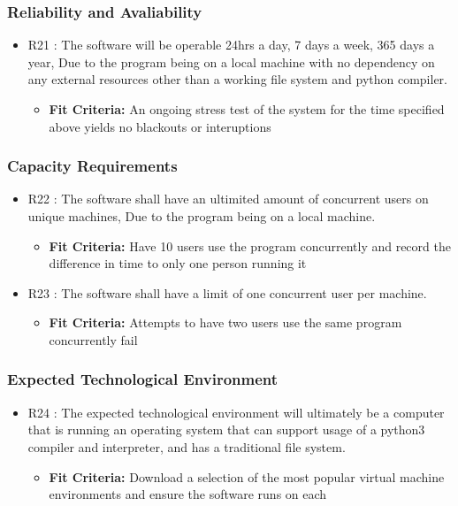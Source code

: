 \documentclass[12pt, titlepage]{article}
\begin{document}
\subsubsection{Reliability and Avaliability}
\begin{itemize}
\item{R21 : The software will be operable 24hrs a day, 7 days a week, 365 days a year, Due to the program being on a local machine with no dependency on any external resources other than a working file system and python compiler.}
\begin{itemize}
\item{\textbf{Fit Criteria:} An ongoing stress test of the system for the time specified above yields no blackouts or interuptions}
\end{itemize}
\end{itemize}
\subsubsection{Capacity Requirements}
\begin{itemize}
\item{R22 : The software shall have an ultimited amount of concurrent users on unique machines, Due to the program being on a local machine.}
\begin{itemize}
\item{\textbf{Fit Criteria:} Have 10 users use the program concurrently and record the difference in time to only one person running it}
\end{itemize}
\item{R23 : The software shall have a limit of one concurrent user per machine.}
\begin{itemize}
\item{\textbf{Fit Criteria:} Attempts to have two users use the same program concurrently fail}
\end{itemize}
\end{itemize}
\subsubsection{Expected Technological Environment}
\label{sec:ETE}
\begin{itemize}
\item{R24 : The expected technological environment will ultimately be a computer that is running an operating system that can support usage of a python3 compiler and interpreter, and has a traditional file system.}
\begin{itemize}
\item{\textbf{Fit Criteria:} Download a selection of the most popular virtual machine environments and ensure the software runs on each}
\end{itemize}
\end{itemize}
\end{document}
